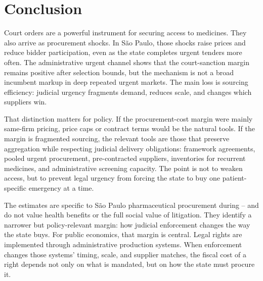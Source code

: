 \section{Conclusion}
\label{sec:conclusion}

Court orders are a powerful instrument for securing access to
medicines. They also arrive as procurement shocks. In S\~ao Paulo,
those shocks raise prices and reduce bidder participation, even as
the state completes urgent tenders more often. The administrative
urgent channel shows that the court-sanction margin remains positive
after selection bounds, but the mechanism is not a broad incumbent
markup in deep repeated urgent markets. The main loss is sourcing
efficiency: judicial urgency fragments demand, reduces scale, and
changes which suppliers win.

That distinction matters for policy. If the procurement-cost margin
were mainly same-firm pricing, price caps or contract terms would be
the natural tools. If the margin is fragmented sourcing, the relevant
tools are those that preserve aggregation while respecting judicial
delivery obligations: framework agreements, pooled urgent
procurement, pre-contracted suppliers, inventories for recurrent
medicines, and administrative screening capacity. The point is not to
weaken access, but to prevent legal urgency from forcing the state to
buy one patient-specific emergency at a time.

The estimates are specific to S\~ao Paulo pharmaceutical procurement
during \BPsampleStartYear--\BPsampleEndYear{} and do not value health
benefits or the full social value of litigation. They identify a narrower but policy-relevant
margin: how judicial enforcement changes the way the state buys.
For public economics, that margin is central. Legal rights are
implemented through administrative production systems. When
enforcement changes those systems' timing, scale, and supplier
matches, the fiscal cost of a right depends not only on what is
mandated, but on how the state must procure it.
